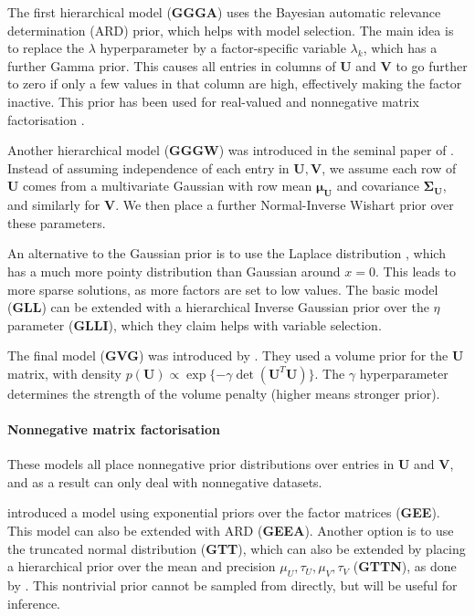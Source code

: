\documentclass[letterpaper]{article} %
\newcommand{\U}{\boldsymbol U}
\newcommand{\V}{\boldsymbol V}
\begin{document}
			The first hierarchical model (\textbf{GGGA}) uses the Bayesian automatic relevance determination (ARD) prior, which helps with model selection. The main idea is to replace the $\lambda$ hyperparameter by a factor-specific variable $\lambda_k$, which has a further Gamma prior. This causes all entries in columns of $\U$ and $\V$ to go further to zero if only a few values in that column are high, effectively making the factor inactive. This prior has been used for real-valued \cite{Virtanen2011,Virtanen2012} and nonnegative matrix factorisation \cite{Tan2013}.
			
			Another hierarchical model (\textbf{GGGW}) was introduced in the seminal paper of \cite{Salakhutdinov2008}. Instead of assuming independence of each entry in $\U, \V$, we assume each row of $\U$ comes from a multivariate Gaussian with row mean $\boldsymbol{\mu_U}$ and covariance $\boldsymbol{\Sigma_U}$, and similarly for $\V$. We then place a further Normal-Inverse Wishart prior over these parameters. 
			
			An alternative to the Gaussian prior is to use the Laplace distribution \cite{Jing2015}, which has a much more pointy distribution than Gaussian around $x=0$. This leads to more sparse solutions, as more factors are set to low values. The basic model (\textbf{GLL}) can be extended with a hierarchical Inverse Gaussian prior over the $\eta$ parameter (\textbf{GLLI}), which they claim helps with variable selection.
			
			The final model (\textbf{GVG}) was introduced by \cite{Arngren2011}. They used a volume prior for the $\U$ matrix, with density $p(\U) \propto \exp \lbrace - \gamma \det (\U^T \U) \rbrace $. The $\gamma$ hyperparameter determines the strength of the volume penalty (higher means stronger prior).
			
		\paragraph{Nonnegative matrix factorisation}
			These models all place nonnegative prior distributions over entries in $\U$ and $\V$, and as a result can only deal with nonnegative datasets. 
			
			\cite{Schmidt2009} introduced a model using exponential priors over the factor matrices (\textbf{GEE}). This model can also be extended with ARD \cite{Brouwer2017b} (\textbf{GEEA}). Another option is to use the truncated normal distribution (\textbf{GTT}), which can also be extended by placing a hierarchical prior over the mean and precision $\mu_U, \tau_U, \mu_V, \tau_V$ (\textbf{GTTN}), as done by \cite{MikkelN.Schmidt2009}. This nontrivial prior cannot be sampled from directly, but will be useful for inference.
			
\end{document}
